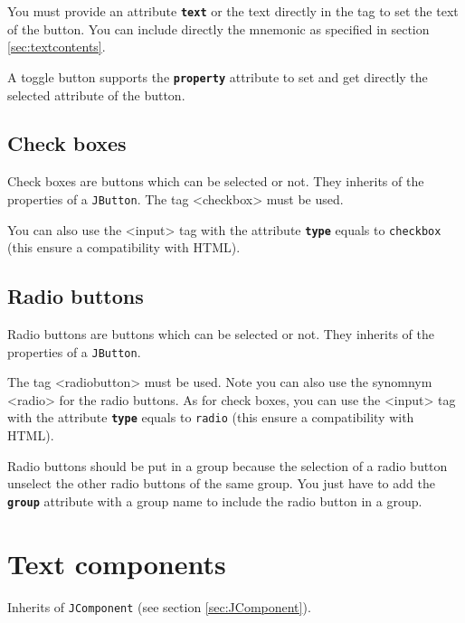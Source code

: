 \documentclass[a4paper,onecolumn,10pt]{book}
\newcommand{\jclass}[1]{\texttt{\small #1}}
\newcommand{\tag}[1]{\textsf{<#1>}}
\newcommand{\attr}[1]{\texttt{\small \textbf{#1}}}
\begin{document}
You must provide an attribute \attr{text} or the text directly
in the tag to set the text of the button. You can include
directly the mnemonic as specified in section \ref{sec:textcontents}.

A toggle button supports the \attr{property} attribute to set
and get directly the selected attribute of the button.



\subsection{\label{sec:JCheckBox}Check boxes}
Check boxes are buttons which can be selected or not. They inherits
of the properties of a \jclass{JButton}. The tag \tag{checkbox} must be
used.

You can also use the \tag{input} tag with the attribute \attr{type} equals
to \verb|checkbox| (this ensure a compatibility with HTML).

\subsection{\label{sec:JRadioButton}Radio buttons}
Radio buttons are buttons which can be selected or not. They inherits
of the properties of a \jclass{JButton}. 

The tag \tag{radiobutton} must be used. Note you can also use the 
synomnym \tag{radio} for the radio buttons. As for check boxes,
you can use the \tag{input} tag with the attribute \attr{type} equals
to \verb|radio| (this ensure a compatibility with HTML).

Radio buttons should be put in a group because the selection of
a radio button unselect the other radio buttons of the same group.
You just have to add the \attr{group} attribute with a group name
to include the radio button in a group.

\section{\label{sec:JTextComponent}Text components}
Inherits of \jclass{JComponent} (see section \ref{sec:JComponent}).
\end{document}
